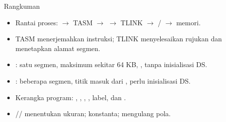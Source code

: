 \documentclass[aspectratio=169,11pt]{beamer}
\begin{document}
\begin{frame}{Rangkuman}
\small
\begin{itemize}
    \item Rantai proses:  $\rightarrow$ TASM
          $\rightarrow$  $\rightarrow$ TLINK
          $\rightarrow$ / $\rightarrow$
          memori.

    \vspace{0.15em}
    \item TASM menerjemahkan instruksi; TLINK menyelesaikan rujukan
          dan menetapkan alamat segmen.

    \vspace{0.15em}
    \item {}: satu segmen, maksimum sekitar 64 KB,
          , tanpa inisialisasi DS.

    \vspace{0.15em}
    \item {}: beberapa segmen, titik masuk dari ,
          perlu inisialisasi DS.

    \vspace{0.15em}
    \item Kerangka program: , , ,
          , label, dan .

    \vspace{0.15em}
    \item {}// menentukan ukuran;
           konstanta;  mengulang pola.
\end{itemize}
\end{frame}
\end{document}
